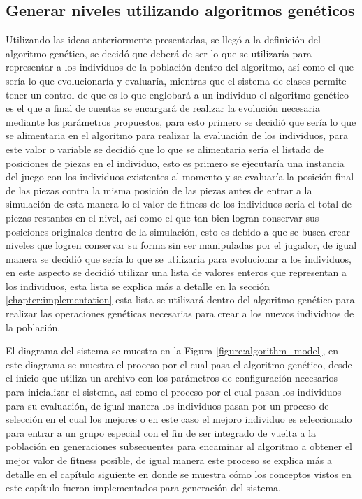 \subsection{Generar niveles utilizando algoritmos genéticos}
\label{subsection:generate-levels-using-GA}

Utilizando las ideas anteriormente presentadas, se llegó a la definición del
algoritmo genético, se decidó que deberá de ser lo que se utilizaría para
representar a los individuos de la población dentro del algoritmo, así como el
que sería lo que evolucionaría y evaluaría, mientras que el sistema de clases
permite tener un control de que es lo que englobará a un individuo el algoritmo
genético es el que a final de cuentas se encargará de realizar la evolución
necesaria mediante los parámetros propuestos, para esto primero se decidió que
sería lo que se alimentaria en el algoritmo para realizar la evaluación de los
individuos, para este valor o variable se decidió que lo que se alimentaria
sería el listado de posiciones de piezas en el individuo, esto es primero se
ejecutaría una instancia del juego con los individuos existentes al momento y se
evaluaría la posición final de las piezas contra la misma posición de las piezas
antes de entrar a la simulación de esta manera lo el valor de fitness de los
individuos sería el total de piezas restantes en el nivel, así como el que tan
bien logran conservar sus posiciones originales dentro de la simulación, esto es
debido a que se busca crear niveles que logren conservar su forma sin ser
manipuladas por el jugador, de igual manera se decidió que sería lo que se
utilizaría para evolucionar a los individuos, en este aspecto se decidió
utilizar una lista de valores enteros que representan a los individuos, esta
lista se explica más a detalle en la sección \ref{chapter:implementation} esta
lista se utilizará dentro del algoritmo genético para realizar las operaciones
genéticas necesarias para crear a los nuevos individuos de la población. 

El diagrama del sistema se muestra en la Figura \ref{figure:algorithm_model}, en
este diagrama se muestra el proceso por el cual pasa el algoritmo genético, desde
el inicio que utiliza un archivo con los parámetros de configuración necesarios
para inicializar el sistema, así como el proceso por el cual pasan los
individuos para su evaluación, de igual manera los individuos pasan por un
proceso de selección en el cual los mejores o en este caso el mejoro individuo
es seleccionado para entrar a un grupo especial con el fin de ser integrado de
vuelta a la población en generaciones subsecuentes para encaminar al algoritmo a
obtener el mejor valor de fitness posible, de igual manera este proceso se
explica más a detalle en el capítulo siguiente en donde se muestra cómo los
conceptos vistos en este capítulo fueron implementados para generación del
sistema.

